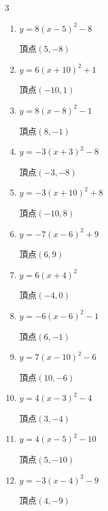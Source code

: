 \begin{multicols}{3}
\begin{enumerate}
  \item $\displaystyle y=8\left( x-5\right)^{2}-8$

        $\displaystyle 頂点\left( 5 , -8 \right)$

  \item $\displaystyle y=6\left( x+10\right)^{2}+1$

        $\displaystyle 頂点\left( -10 , 1 \right)$

  \item $\displaystyle y=8\left( x-8\right)^{2}-1$

        $\displaystyle 頂点\left( 8 , -1 \right)$

  \item $\displaystyle y=-3\left( x+3\right)^{2}-8$

        $\displaystyle 頂点\left( -3 , -8 \right)$

  \item $\displaystyle y=-3\left( x+10\right)^{2}+8$

        $\displaystyle 頂点\left( -10 , 8 \right)$

  \item $\displaystyle y=-7\left( x-6\right)^{2}+9$

        $\displaystyle 頂点\left( 6 , 9 \right)$

  \item $\displaystyle y=6\left( x+4\right)^{2}$

        $\displaystyle 頂点\left( -4 , 0 \right)$

  \item $\displaystyle y=-6\left( x-6\right)^{2}-1$

        $\displaystyle 頂点\left( 6 , -1 \right)$

  \item $\displaystyle y=7\left( x-10\right)^{2}-6$

        $\displaystyle 頂点\left( 10 , -6 \right)$

  \item $\displaystyle y=4\left( x-3\right)^{2}-4$

        $\displaystyle 頂点\left( 3 , -4 \right)$

  \item $\displaystyle y=4\left( x-5\right)^{2}-10$

        $\displaystyle 頂点\left( 5 , -10 \right)$

  \item $\displaystyle y=-3\left( x-4\right)^{2}-9$

        $\displaystyle 頂点\left( 4 , -9 \right)$


\end{enumerate}
\end{multicols}
